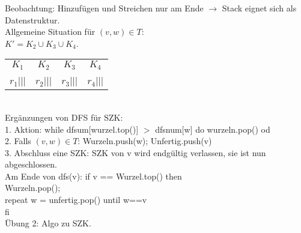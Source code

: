 \documentclass[a4paper]{article}
\newcommand{\pl}{\hspace*{1cm}}
\begin{document}
Beobachtung: Hinzufügen und Streichen nur am Ende $\rightarrow$ Stack eignet sich als Datenstruktur.\\
Allgemeine Situation für $(v,w)\in T$:\\
$K' = K_2\cup K_3\cup K_4$.\\
\begin{tabular}{c|c|c|c}
$K_1$&$K_2$&$K_3$&$K_4$\\
$r_1$|||&$r_2$|||&$r_3$|||&$r_4$|||\\
\end{tabular}\\
Ergänzungen von DFS für SZK:\\
1. Aktion: while dfsum[wurzel.top()] $>$ dfsnum[w] do wurzeln.pop() od\\
2. Falls $(v,w)\in T$: Wurzeln.push(w); Unfertig.push(v)\\
3. Abschluss eine SZK: SZK von v wird endgültig verlassen, sie ist nun abgeschlossen.\\
\pl Am Ende von dfs(v): if v == Wurzel.top() then \\
\pl \pl Wurzeln.pop();\\
\pl \pl repeat w = unfertig.pop() until w==v\\
\pl fi\\
Übung 2: Algo zu SZK.
\end{document}
